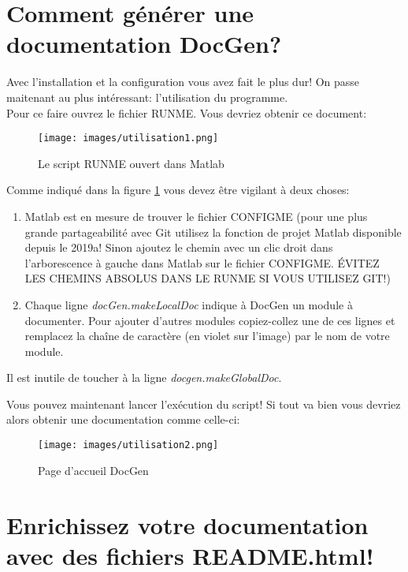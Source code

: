 \documentclass[./standalone.tex]{subfiles}
\begin{document}
\section{Comment générer une documentation DocGen?}
Avec l'installation et la configuration vous avez fait le plus dur! On passe maitenant au plus intéressant: l'utilisation du programme.\\

Pour ce faire ouvrez le fichier RUNME. Vous devriez obtenir ce document:

\begin{figure}[h!]
    \centering
    \texttt{[image: images/utilisation1.png]}
    \caption{Le script RUNME ouvert dans Matlab}
    \label{fig:RUNME_Matlab}
\end{figure}

Comme indiqué dans la figure \ref{fig:RUNME_Matlab} vous devez être vigilant à deux choses:\\

\begin{enumerate}
    \item Matlab est en mesure de trouver le fichier CONFIGME (pour une plus grande partageabilité avec Git utilisez la fonction de projet Matlab disponible depuis le 2019a! Sinon ajoutez le chemin avec un clic droit dans l'arborescence à gauche dans Matlab sur le fichier CONFIGME. ÉVITEZ LES CHEMINS ABSOLUS DANS LE RUNME SI VOUS UTILISEZ GIT!)
    \item Chaque ligne \textit{docGen.makeLocalDoc} indique à DocGen un module à documenter. Pour ajouter d'autres modules copiez-collez une de ces lignes et remplacez la chaîne de caractère (en violet sur l'image) par le nom de votre module.\\
\end{enumerate}

Il est inutile de toucher à la ligne \textit{docgen.makeGlobalDoc}.\\
\newpage

Vous pouvez maintenant lancer l'exécution du script! Si tout va bien vous devriez alors obtenir une documentation comme celle-ci:

\begin{figure}[h!]
    \centering
    \texttt{[image: images/utilisation2.png]}
    \caption{Page d'accueil DocGen}
    \label{fig:Homepage_DocGen}
\end{figure}


\section{Enrichissez votre documentation avec des fichiers README.html!}
\end{document}
